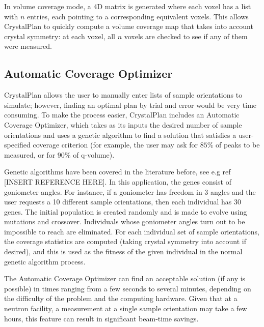 \documentclass[draft]{iucr}              %
\begin{document}
In volume coverage mode, a 4D matrix is generated where each voxel has a list
with $n$ entries, each pointing to a corresponding equivalent voxels. This
allows CrystalPlan to quickly compute a volume coverage map that takes into
account crystal symmetry: at each voxel, all $n$ voxels are checked to
see if any of them were measured. 



\subsection{Automatic Coverage Optimizer}

CrystalPlan allows the user to manually enter lists of sample orientations to
simulate; however, finding an optimal plan by trial and error would be very time
consuming. To make the process easier, CrystalPlan includes an Automatic
Coverage Optimizer, which takes as its inputs the desired number of sample
orientations and uses a genetic algorithm to find a solution that satisfies a
user-specified coverage criterion (for example, the user may ask for $85\%$ of
peaks to be measured, or for $90\%$ of q-volume).           

Genetic algorithms have been covered in the literature before, see e.g ref
[INSERT REFERENCE HERE]. In this application, the genes consist of goniometer
angles. For instance, if a goniometer has freedom in 3 angles and the user
requests a 10 different sample orientations, then each individual has 30 genes.
The initial population is created randomly and is made to evolve using mutations
and crossover. Individuals whose goniometer angles turn out to be impossible to
reach are eliminated. For each individual set of sample orientations, the
coverage statistics are computed (taking crystal symmetry into account if desired), and this is used as the fitness of the given individual in the normal genetic
algorithm process.             

The Automatic Coverage Optimizer can find an acceptable solution (if any is
possible) in times ranging from a few seconds to several minutes, depending on
the difficulty of the problem and the computing hardware. Given that at a
neutron facility, a measurement at a single sample orientation may take a few
hours, this feature can result in significant beam-time savings.           




\end{document}
